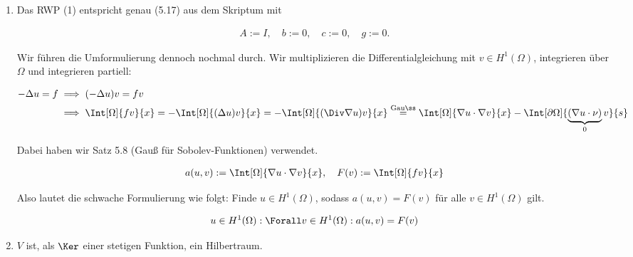 \begin{solution}

\phantom{}

\begin{enumerate}[label = \alph*)]

    \item Das RWP (1) entspricht genau (5.17) aus dem Skriptum mit

    \begin{align*}
        A := I, \quad b := 0, \quad c := 0, \quad g := 0.
    \end{align*}

    Wir führen die Umformulierung dennoch nochmal durch.
    Wir multiplizieren die Differentialgleichung mit $v \in H^1(\Omega)$, integrieren über $\Omega$ und integrieren partiell:

    \begin{align*}
        -\Delta u = f
        & \implies
        (-\Delta u) v = f v \\
        & \implies
        \Int[\Omega]{f v}{x}
        =
        -\Int[\Omega]{(\Delta u) v}{x}
        =
        -\Int[\Omega]{(\Div \nabla u) v}{x}
        \stackrel
        {
            \mathrm{Gauß}
        }{=}
        \Int[\Omega]{\nabla u \cdot \nabla v}{x}
        -
        \Int[\partial \Omega]{\underbrace{(\nabla u \cdot \nu)}_0 v}{s}
    \end{align*}

    Dabei haben wir Satz 5.8 (Gauß für Sobolev-Funktionen) verwendet.

    \begin{align*}
        a(u, v) := \Int[\Omega]{\nabla u \cdot \nabla v}{x},
        \quad
        F(v) := \Int[\Omega]{f v}{x}
    \end{align*}

    Also lautet die schwache Formulierung wie folgt:
    Finde $u \in H^1(\Omega)$, sodass $a(u, v) = F(v)$ für alle $v \in H^1(\Omega)$ gilt.

    \begin{align*}
        u \in H^1(\Omega):
        \Forall v \in H^1(\Omega):
        a(u, v) = F(v)
    \end{align*}

    \item $V$ ist, als $\Ker$ einer stetigen Funktion, ein Hilbertraum.


\end{enumerate}
\end{solution}

